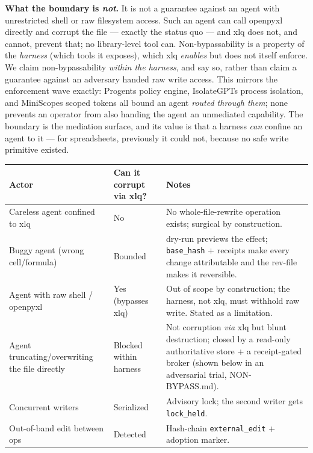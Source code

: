 \documentclass[
]{article}
\newcounter{none} %
\begin{document}
\textbf{What the boundary is \emph{not}.} It is not a guarantee against
an agent with unrestricted shell or raw filesystem access. Such an agent
can call openpyxl directly and corrupt the file --- exactly the status
quo --- and xlq does not, and cannot, prevent that; no library-level
tool can. Non-bypassability is a property of the \emph{harness} (which
tools it exposes), which xlq \emph{enables} but does not itself enforce.
We claim non-bypassability \emph{within the harness}, and say so, rather
than claim a guarantee against an adversary handed raw write access.
This mirrors the enforcement wave exactly: Progent\textquotesingle s
policy engine, IsolateGPT\textquotesingle s process isolation, and
MiniScope\textquotesingle s scoped tokens all bound an agent
\emph{routed through them}; none prevents an operator from also handing
the agent an unmediated capability. The boundary is the mediation
surface, and its value is that a harness \emph{can} confine an agent to
it --- for spreadsheets, previously it could not, because no safe write
primitive existed.

{\def\LTcaptype{none} %
\begin{longtable}[]{@{}lll@{}}
\toprule\noalign{}
Actor & Can it corrupt via xlq? & Notes \\
\midrule\noalign{}
\endhead
\bottomrule\noalign{}
\endlastfoot
Careless agent confined to xlq & No & No whole-file-rewrite operation
exists; surgical by construction. \\
Buggy agent (wrong cell/formula) & Bounded & dry-run previews the
effect; \texttt{base\_hash} + receipts make every change attributable
and the rev-file makes it reversible. \\
Agent with raw shell / openpyxl & Yes (bypasses xlq) & Out of scope by
construction; the harness, not xlq, must withhold raw write. Stated as a
limitation. \\
Agent truncating/overwriting the file directly & Blocked within harness
& Not corruption \emph{via} xlq but blunt destruction; closed by a
read-only authoritative store + a receipt-gated broker (shown below in
an adversarial trial, NON-BYPASS.md). \\
Concurrent writers & Serialized & Advisory lock; the second writer gets
\texttt{lock\_held}. \\
Out-of-band edit between ops & Detected & Hash-chain
\texttt{external\_edit} + adoption marker. \\
\end{longtable}
}
\end{document}
